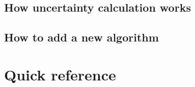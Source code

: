 \documentclass[12pt,a4paper,oneside]{report} %
\begin{document}
\section{How uncertainty calculation works}

\section{How to add a new algorithm}

\printbibliography[title={Bilbiography},heading={bibnumbered}]

\appendix \chapter{Quick reference} %
\newpage
\end{document}
